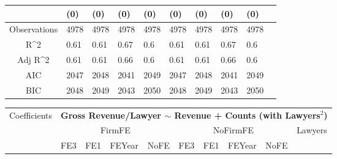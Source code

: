 \documentclass{article}
\begin{document}
\begin{table}[H]
\begin{tabular}{|clllllllll|}
   & (0) & (0) & (0) & (0) & (0) & (0) & (0) & (0) & \\ 
  \hline 
 Observations & 4978 & 4978 & 4978 & 4978 & 4978 & 4978 & 4978 & 4978 & \\ 
  R^2 & 0.61 & 0.61 & 0.67 & 0.6 & 0.61 & 0.61 & 0.67 & 0.6 & \\ 
  Adj R^2 & 0.61 & 0.61 & 0.66 & 0.6 & 0.61 & 0.61 & 0.66 & 0.6 & \\ 
  AIC & 2047 & 2048 & 2041 & 2049 & 2047 & 2048 & 2041 & 2049 & \\ 
  BIC & 2048 & 2049 & 2043 & 2050 & 2048 & 2049 & 2043 & 2050 & \\ 
   \hline
\end{tabular}
 
\end{table}


\begin{table}[H]
\centering
\begin{tabular}{|clllllllll|}
\hline
\multirow{3}{*}{Coefficients} & \multicolumn{9}{c|}{\textbf{Gross Revenue/Lawyer $\sim$ Revenue + Counts (with Lawyers$^2$)}} \\
\cline{2-10}
& \multicolumn{4}{c}{FirmFE} & \multicolumn{4}{c}{NoFirmFE} & \multirow{2}{*}{Lawyers} \\
\cline{2-9}
& FE3 & FE1 & FEYear & NoFE & FE3 & FE1 & FEYear & NoFE &  \\
\hline
 

\end{tabular}
\end{table}
\end{document}
